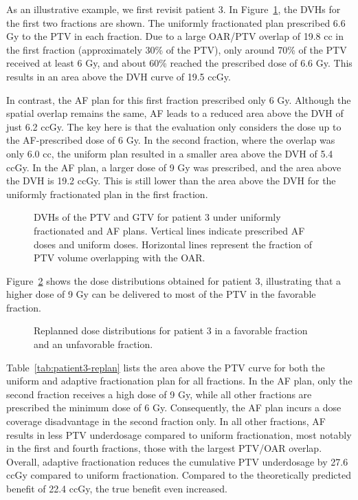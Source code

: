 \documentclass[11pt]{article}
\begin{document}
As an illustrative example, we first revisit patient 3. In Figure~\ref{fig:patient3-dvh}, the DVHs for the first two fractions are shown. The uniformly fractionated plan prescribed 6.6 Gy to the PTV in each fraction. Due to a large OAR/PTV overlap of 19.8 cc in the first fraction (approximately 30\% of the PTV), only around 70\% of the PTV received at least 6 Gy, and about 60\% reached the prescribed dose of 6.6 Gy. This results in an area above the DVH curve of 19.5 ccGy.

In contrast, the AF plan for this first fraction prescribed only 6 Gy. Although the spatial overlap remains the same, AF leads to a reduced area above the DVH of just 6.2 ccGy. The key here is that the evaluation only considers the dose up to the AF-prescribed dose of 6 Gy. In the second fraction, where the overlap was only 6.0 cc, the uniform plan resulted in a smaller area above the DVH of 5.4 ccGy. In the AF plan, a larger dose of 9 Gy was prescribed, and the area above the DVH is 19.2 ccGy. This is still lower than the area above the DVH for the uniformly fractionated plan in the first fraction.

\begin{figure}[ht]
\centering
{}
\caption{DVHs of the PTV and GTV for patient 3 under uniformly fractionated and AF plans. Vertical lines indicate prescribed AF doses and uniform doses. Horizontal lines represent the fraction of PTV volume overlapping with the OAR.}
\label{fig:patient3-dvh}
\end{figure}

Figure~\ref{fig:patient3-dose-dist} shows the dose distributions obtained for patient 3, illustrating that a higher dose of 9 Gy can be delivered to most of the PTV in the favorable fraction.

\begin{figure}[ht]
\centering
{}
\caption{Replanned dose distributions for patient 3 in a favorable fraction and an unfavorable fraction.}
\label{fig:patient3-dose-dist}
\end{figure}

Table~\ref{tab:patient3-replan} lists the area above the PTV curve for both the uniform and adaptive fractionation plan for all fractions. In the AF plan, only the second fraction receives a high dose of 9 Gy, while all other fractions are prescribed the minimum dose of 6 Gy. Consequently, the AF plan incurs a dose coverage disadvantage in the second fraction only. In all other fractions, AF results in less PTV underdosage compared to uniform fractionation, most notably in the first and fourth fractions, those with the largest PTV/OAR overlap. Overall, adaptive fractionation reduces the cumulative PTV underdosage by 27.6 ccGy compared to uniform fractionation. Compared to the theoretically predicted benefit of 22.4 ccGy, the true benefit even increased.
\end{document}
